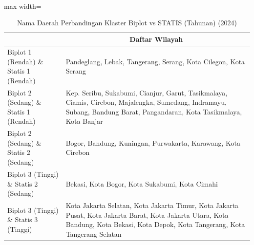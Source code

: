 \begin{table}[H]
\centering
\caption{Nama Daerah Perbandingan Klaster Biplot vs STATIS (Tahunan) (2024)} \label{tab:app1biplot_statis_comp_name_2024}
\begin{adjustbox}{max width=\textwidth}
\begin{tabular}{|>{\centering\arraybackslash}p{4cm}|p{10cm}|}
\hline
\multicolumn{1}{|c|}{\textbf{Kategori}} & \multicolumn{1}{c|}{\textbf{Daftar Wilayah}} \\
\hline
Biplot 1 (Rendah) \& Statis 1 (Rendah) & Pandeglang, Lebak, Tangerang, Serang, Kota Cilegon, Kota Serang \\
\hline
Biplot 2 (Sedang) \& Statis 1 (Rendah) & Kep. Seribu, Sukabumi, Cianjur, Garut, Tasikmalaya, Ciamis, Cirebon, Majalengka, Sumedang, Indramayu, Subang, Bandung Barat, Pangandaran, Kota Tasikmalaya, Kota Banjar \\
\hline
Biplot 2 (Sedang) \& Statis 2 (Sedang) & Bogor, Bandung, Kuningan, Purwakarta, Karawang, Kota Cirebon \\
\hline
Biplot 3 (Tinggi) \& Statis 2 (Sedang) & Bekasi, Kota Bogor, Kota Sukabumi, Kota Cimahi \\
\hline
Biplot 3 (Tinggi) \& Statis 3 (Tinggi) & Kota Jakarta Selatan, Kota Jakarta Timur, Kota Jakarta Pusat, Kota Jakarta Barat, Kota Jakarta Utara, Kota Bandung, Kota Bekasi, Kota Depok, Kota Tangerang, Kota Tangerang Selatan \\
\hline
\end{tabular}
\end{adjustbox}
\end{table}